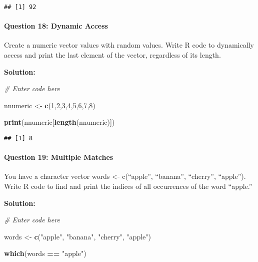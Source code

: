 \documentclass[
]{article}
\newenvironment{Shaded}{\begin{snugshade}}{\end{snugshade}}
\newcommand{\CommentTok}[1]{\textcolor[rgb]{0.56,0.35,0.01}{\textit{#1}}}
\newcommand{\DecValTok}[1]{\textcolor[rgb]{0.00,0.00,0.81}{#1}}
\newcommand{\FunctionTok}[1]{\textcolor[rgb]{0.13,0.29,0.53}{\textbf{#1}}}
\newcommand{\NormalTok}[1]{#1}
\newcommand{\OtherTok}[1]{\textcolor[rgb]{0.56,0.35,0.01}{#1}}
\newcommand{\SpecialCharTok}[1]{\textcolor[rgb]{0.81,0.36,0.00}{\textbf{#1}}}
\newcommand{\StringTok}[1]{\textcolor[rgb]{0.31,0.60,0.02}{#1}}
\begin{document}
\begin{verbatim}
## [1] 92
\end{verbatim}

\hypertarget{question-18-dynamic-access}{%
\paragraph{Question 18: Dynamic
Access}\label{question-18-dynamic-access}}

Create a numeric vector values with random values. Write R code to
dynamically access and print the last element of the vector, regardless
of its length.

\textbf{Solution:}

\begin{Shaded}
\begin{Highlighting}[]
\CommentTok{\# Enter code here}

\NormalTok{nnumeric }\OtherTok{\textless{}{-}} \FunctionTok{c}\NormalTok{(}\DecValTok{1}\NormalTok{,}\DecValTok{2}\NormalTok{,}\DecValTok{3}\NormalTok{,}\DecValTok{4}\NormalTok{,}\DecValTok{5}\NormalTok{,}\DecValTok{6}\NormalTok{,}\DecValTok{7}\NormalTok{,}\DecValTok{8}\NormalTok{)}

\FunctionTok{print}\NormalTok{(nnumeric[}\FunctionTok{length}\NormalTok{(nnumeric)])}
\end{Highlighting}
\end{Shaded}

\begin{verbatim}
## [1] 8
\end{verbatim}

\hypertarget{question-19-multiple-matches}{%
\paragraph{Question 19: Multiple
Matches}\label{question-19-multiple-matches}}

You have a character vector words \textless- c(``apple'', ``banana'',
``cherry'', ``apple''). Write R code to find and print the indices of
all occurrences of the word ``apple.''

\textbf{Solution:}

\begin{Shaded}
\begin{Highlighting}[]
\CommentTok{\# Enter code here}

\NormalTok{words }\OtherTok{\textless{}{-}} \FunctionTok{c}\NormalTok{(}\StringTok{"apple"}\NormalTok{, }\StringTok{"banana"}\NormalTok{, }\StringTok{"cherry"}\NormalTok{, }\StringTok{"apple"}\NormalTok{)}

\FunctionTok{which}\NormalTok{(words }\SpecialCharTok{==} \StringTok{"apple"}\NormalTok{)}
\end{Highlighting}
\end{Shaded}
\end{document}
